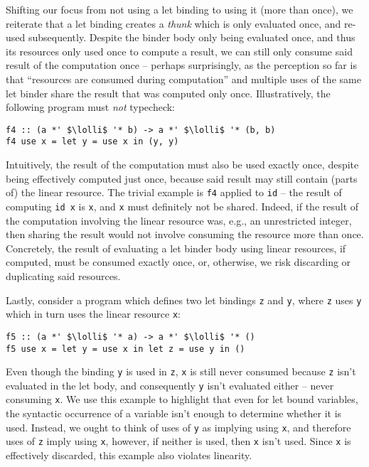 \documentclass[acmsmall,review]{acmart}
\newcommand{\incode}[1]{\lstinline{#1}}
\newcommand{\lolli}{\multimap}
\begin{document}
Shifting our focus from not using a let binding to using it (more than once),
we reiterate that a let binding creates a \emph{thunk} which is only evaluated
once, and re-used subsequently. Despite the binder body only being evaluated
once, and thus its resources only used once to compute a result, we can still
only consume said result of the computation once -- perhaps surprisingly, as the
perception so far is that ``resources are consumed during computation'' and
multiple uses of the same let binder share the result that was computed only
once. Illustratively, the following program must \emph{not} typecheck:
%
\begin{noway}
\begin{lstlisting}
f4 :: (a *' $\lolli$ '* b) -> a *' $\lolli$ '* (b, b)
f4 use x = let y = use x in (y, y)
\end{lstlisting}
\end{noway}
%
Intuitively, the result of the computation must also be used exactly once,
despite being effectively computed just once, because said result may still
contain (parts of) the linear resource. The trivial example is \lstinline{f4} applied to
\incode{id} -- the result of computing \incode{id x} is \incode{x}, and \incode{x} must definitely not be
shared. Indeed, if the result of the computation involving the linear resource
was, e.g., an unrestricted integer, then sharing the result would not involve consuming the
resource more than once.
%
Concretely, the result of evaluating a let binder body using linear resources, if computed, must be
consumed exactly once, or, otherwise, we risk discarding or duplicating said resources.

Lastly, consider a program which defines two let bindings \incode{z} and \incode{y}, where
\incode{z} uses \incode{y} which in turn uses the linear resource \incode{x}:
%
\begin{noway}
\begin{lstlisting}
f5 :: (a *' $\lolli$ '* a) -> a *' $\lolli$ '* ()
f5 use x = let y = use x in let z = use y in ()
\end{lstlisting}
\end{noway}
%
Even though the binding \incode{y} is used in \incode{z}, \incode{x} is still never consumed because
\incode{z} isn't evaluated in the let body, and consequently \incode{y} isn't evaluated
either -- never consuming \incode{x}. We use this example to highlight that even for
let bound variables, the syntactic occurrence of a variable isn't enough to
determine whether it is used. Instead, we ought to think of uses of \incode{y} as
implying using \incode{x}, and therefore uses of \incode{z} imply using \incode{x}, however, if
neither is used, then \incode{x} isn't used. Since \incode{x} is effectively discarded, this
example also violates linearity.
\end{document}
